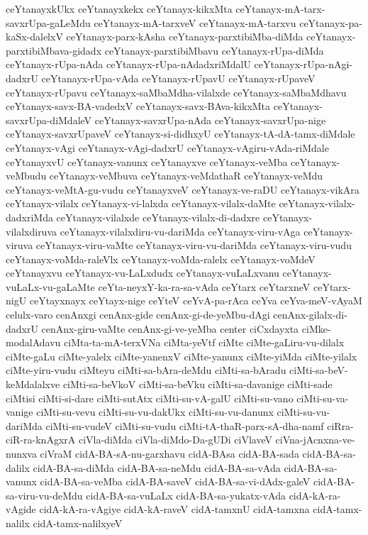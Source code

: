 {ceYtanayxkUkx
ceYtanayxkekx
ceYtanayx-kikxMta
ceYtanayx-mA-tarx-savxrUpa-gaLeMdu
ceYtanayx-mA-tarxveV
ceYtanayx-mA-tarxvu
ceYtanayx-pa-kaSx-dalelxV
ceYtanayx-parx-kAsha
ceYtanayx-parxtibiMba-diMda
ceYtanayx-parxtibiMbava-gidadx
ceYtanayx-parxtibiMbavu
ceYtanayx-rUpa-diMda
ceYtanayx-rUpa-nAda
ceYtanayx-rUpa-nAdadxriMdalU
ceYtanayx-rUpa-nAgi-dadxrU
ceYtanayx-rUpa-vAda
ceYtanayx-rUpavU
ceYtanayx-rUpaveV
ceYtanayx-rUpavu
ceYtanayx-saMbaMdha-vilalxde
ceYtanayx-saMbaMdhavu
ceYtanayx-savx-BA-vadedxV
ceYtanayx-savx-BAva-kikxMta
ceYtanayx-savxrUpa-diMdaleV
ceYtanayx-savxrUpa-nAda
ceYtanayx-savxrUpa-nige
ceYtanayx-savxrUpaveV
ceYtanayx-si-didhxyU
ceYtanayx-tA-dA-tamx-diMdale
ceYtanayx-vAgi
ceYtanayx-vAgi-dadxrU
ceYtanayx-vAgiru-vAda-riMdale
ceYtanayxvU
ceYtanayx-vanunx
ceYtanayxve
ceYtanayx-veMba
ceYtanayx-veMbudu
ceYtanayx-veMbuva
ceYtanayx-veMdathaR
ceYtanayx-veMdu
ceYtanayx-veMtA-gu-vudu
ceYtanayxveV
ceYtanayx-ve-raDU
ceYtanayx-vikAra
ceYtanayx-vilalx
ceYtanayx-vi-lalxda
ceYtanayx-vilalx-daMte
ceYtanayx-vilalx-dadxriMda
ceYtanayx-vilalxde
ceYtanayx-vilalx-di-dadxre
ceYtanayx-vilalxdiruva
ceYtanayx-vilalxdiru-vu-dariMda
ceYtanayx-viru-vAga
ceYtanayx-viruva
ceYtanayx-viru-vaMte
ceYtanayx-viru-vu-dariMda
ceYtanayx-viru-vudu
ceYtanayx-voMda-raleVlx
ceYtanayx-voMda-ralelx
ceYtanayx-voMdeV
ceYtanayxvu
ceYtanayx-vu-LaLxdudx
ceYtanayx-vuLaLxvanu
ceYtanayx-vuLaLx-vu-gaLaMte
ceYta-neyxY-ka-ra-sa-vAda
ceYtarx
ceYtarxneV
ceYtarx-nigU
ceYtayxnayx
ceYtayx-nige
ceYteV
ceYvA-pa-rAca
ceYva
ceYva-meV-vAyaM
celulx-varo
cenAnxgi
cenAnx-gide
cenAnx-gi-de-yeMbu-dAgi
cenAnx-gilalx-di-dadxrU
cenAnx-giru-vaMte
cenAnx-gi-ve-yeMba
center
ciCxdayxta
ciMke-modalAdavu
ciMta-ta-mA-terxVNa
ciMta-yeVtf
ciMte
ciMte-gaLiru-vu-dilalx
ciMte-gaLu
ciMte-yalelx
ciMte-yanenxV
ciMte-yanunx
ciMte-yiMda
ciMte-yilalx
ciMte-yiru-vudu
ciMteyu
ciMti-sa-bAra-deMdu
ciMti-sa-bAradu
ciMti-sa-beV-keMdalalxve
ciMti-sa-beVkoV
ciMti-sa-beVku
ciMti-sa-davanige
ciMti-sade
ciMtisi
ciMti-si-dare
ciMti-sutAtx
ciMti-su-vA-galU
ciMti-su-vano
ciMti-su-va-vanige
ciMti-su-vevu
ciMti-su-vu-dakUkx
ciMti-su-vu-danunx
ciMti-su-vu-dariMda
ciMti-su-vudeV
ciMti-su-vudu
ciMti-tA-thaR-parx-sA-dha-namf
ciRra-ciR-ra-knAgxrA
ciVla-diMda
ciVla-diMdo-Da-gUDi
ciVlaveV
ciVna-jAcnxna-ve-nunxva
ciVraM
cidA-BA-sA-nu-garxhavu
cidA-BAsa
cidA-BA-sada
cidA-BA-sa-dalilx
cidA-BA-sa-diMda
cidA-BA-sa-neMdu
cidA-BA-sa-vAda
cidA-BA-sa-vanunx
cidA-BA-sa-veMba
cidA-BA-saveV
cidA-BA-sa-vi-dAdx-galeV
cidA-BA-sa-viru-vu-deMdu
cidA-BA-sa-vuLaLx
cidA-BA-sa-yukatx-vAda
cidA-kA-ra-vAgide
cidA-kA-ra-vAgiye
cidA-kA-raveV
cidA-tamxnU
cidA-tamxna
cidA-tamx-nalilx
cidA-tamx-nalilxyeV
}
